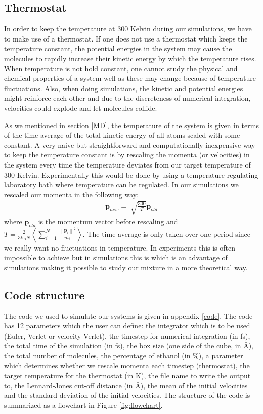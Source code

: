 \documentclass[11pt,a4paper]{article}
\begin{document}
\subsection{Thermostat}
In order to keep the temperature at 300 Kelvin during our simulations, we have to make use of a thermostat. If one does not use a thermostat which keeps the temperature constant, the potential energies in the system may cause the molecules to rapidly increase their kinetic energy by which the temperature rises. When temperature is not hold constant, one cannot study the physical and chemical properties of a system well as these may change because of temperature fluctuations. Also, when doing simulations, the kinetic and potential energies might reinforce each other and due to the discreteness of numerical integration, velocities could explode and let molecules collide.

As we mentioned in section \ref{MD}, the temperature of the system is given in terms of the time average of the total kinetic energy of all atoms scaled with some constant. A very naive but straightforward and computationally inexpensive way to keep the temperature constant is by rescaling the momenta (or velocities) in the system every time the temperature deviates from our target temperature of 300 Kelvin. Experimentally this would be done by using a temperature regulating laboratory bath where temperature can be regulated. In our simulations we rescaled our momenta in the following way:  
\begin{align*}
\textbf{p}_{new} = \sqrt[]{\frac{300}{T}}\textbf{p}_{old}
\end{align*}
where $\textbf{p}_{old}$ is the momentum vector before rescaling and $T = \frac{2}{3 k_B N} \left\langle \sum_{i=1}^N \frac{\left\|\textbf{p}_i\right\|^2}{m_i}\right\rangle$. The time average is only taken over one period since we really want no fluctuations in temperature. In experiments this is often impossible to achieve but in simulations this is which is an advantage of simulations making it possible to study our mixture in a more theoretical way. 

\subsection{Code structure}
The code we used to simulate our systems is given in appendix \ref{code}. The code has 12 parameters which the user can define: the integrator which is to be used (Euler, Verlet or velocity Verlet), the timestep for numerical integration (in fs), the total time of the simulation (in fs), the box size (one side of the cube, in \AA), the total number of molecules, the percentage of ethanol (in \%), a parameter which determines whether we rescale momenta each timestep (thermostat), the target temperature for the thermostat (in K), the file name to write the output to, the Lennard-Jones cut-off distance (in \AA), the mean of the initial velocities and the standard deviation of the initial velocities. The structure of the code is summarized as a flowchart in Figure \ref{fig:flowchart}.
\end{document}
